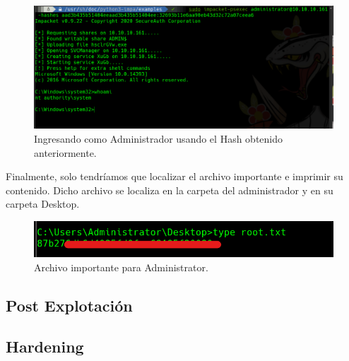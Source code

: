 \documentclass{article}
\begin{document}
\begin{figure}[H]
	\center
	\includegraphics[width=\textwidth]{images/forest/escalado_a_root.png}
	\caption{Ingresando como Administrador usando el Hash obtenido anteriormente.}
\end{figure}

Finalmente, solo tendríamos que localizar el archivo importante e imprimir su contenido. Dicho archivo se localiza en la carpeta del administrador y en su carpeta Desktop.

\begin{figure}[H]
	\center
	\includegraphics[width=\textwidth/2]{images/forest/rootflag.png}
	\caption{Archivo importante para Administrator.}
\end{figure}


\subsection{Post Explotación}

\subsection{Hardening}
\end{document}
